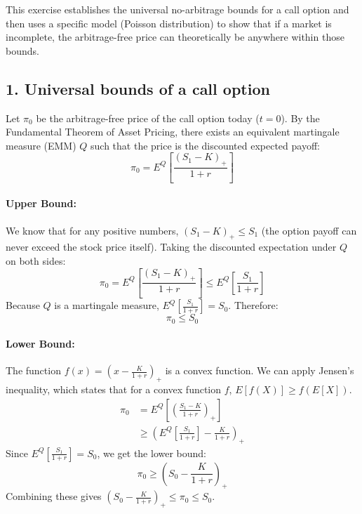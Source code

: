 This exercise establishes the universal no-arbitrage bounds for a call option and then uses a specific model (Poisson distribution) to show that if a market is incomplete, the arbitrage-free price can theoretically be anywhere within those bounds.

\subsection*{1. Universal bounds of a call option}
Let $\pi_{0}$ be the arbitrage-free price of the call option today ($t=0$). By the Fundamental Theorem of Asset Pricing, there exists an equivalent martingale measure (EMM) $Q$ such that the price is the discounted expected payoff:
\begin{equation}
    \pi_{0} = E^{Q}\left[\frac{(S_{1}-K)_{+}}{1+r}\right]
\end{equation}

\paragraph{Upper Bound:}
We know that for any positive numbers, $(S_{1}-K)_{+} \le S_{1}$ (the option payoff can never exceed the stock price itself).
Taking the discounted expectation under $Q$ on both sides:
\begin{equation}
    \pi_{0} = E^{Q}\left[\frac{(S_{1}-K)_{+}}{1+r}\right] \le E^{Q}\left[\frac{S_{1}}{1+r}\right]
\end{equation}
Because $Q$ is a martingale measure, $E^{Q}[\frac{S_{1}}{1+r}] = S_{0}$. Therefore:
\begin{equation}
    \pi_{0} \le S_{0}
\end{equation}

\paragraph{Lower Bound:}
The function $f(x) = (x - \frac{K}{1+r})_{+}$ is a convex function. We can apply Jensen's inequality, which states that for a convex function $f$, $E[f(X)] \ge f(E[X])$.
\begin{align}
    \pi_{0} &= E^{Q}\left[\left(\frac{S_{1} - K}{1+r}\right)_{+}\right] \\
    &\ge \left( E^{Q}\left[\frac{S_{1}}{1+r}\right] - \frac{K}{1+r} \right)_{+}
\end{align}
Since $E^{Q}[\frac{S_{1}}{1+r}] = S_{0}$, we get the lower bound:
\begin{equation}
    \pi_{0} \ge \left(S_{0} - \frac{K}{1+r}\right)_{+}
\end{equation}
Combining these gives $(S_{0}-\frac{K}{1+r})_{+} \le \pi_{0} \le S_{0}$.

